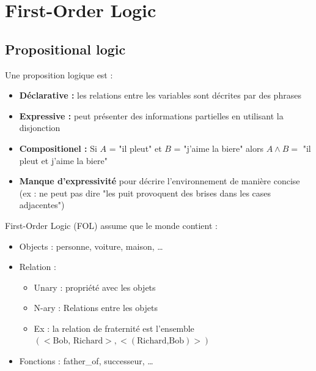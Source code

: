 \section{First-Order Logic}
	\subsection{Propositional logic}
		Une proposition logique est :
		\begin{itemize}
			\item \textbf{Déclarative :} les relations entre les variables sont décrites par des phrases
			\item \textbf{Expressive :} peut présenter des informations partielles en utilisant la disjonction
			\item \textbf{Compositionel :} Si $A$ = "il pleut" et $B$ = "j'aime la biere" alors $A \wedge B =$ "il pleut et j'aime la biere"
			\item \textbf{Manque d'expressivité} pour décrire l'environnement de manière concise (ex : ne peut pas dire "les puit provoquent des brises dans les cases adjacentes")
		\end{itemize}
		
		First-Order Logic (FOL) assume que le monde contient :
		\begin{itemize}
			\item Objects : personne, voiture, maison, \dots
			\item Relation : 
			\begin{itemize}
				\item Unary : propriété avec les objets
				\item N-ary : Relations entre les objets
				\item Ex : la relation de fraternité est l'ensemble $(<\text{Bob, Richard}>,<(\text{Richard,Bob})>)$
			\end{itemize}
			\item Fonctions : father\_of, successeur, \dots
		\end{itemize}
